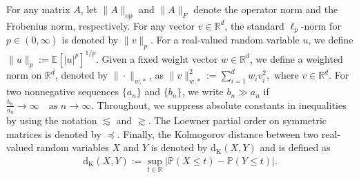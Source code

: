 \documentclass[11pt,letterpaper]{article}
\theoremstyle{plain}
\theoremstyle{definition}  %
\begin{document}
For any matrix $A$, let $\|A\|_{\mathrm{op}}$ and $\|A\|_{F}$ denote the operator norm and the Frobenius norm, respectively. For any vector $v \in \mathbb{R}^d$, the standard $\ell_p$-norm for $p \in (0,\infty)$ is denoted by $\|v\|_p$. For a real-valued random variable $u$, we define $\|u\|_p := \mathbb{E}\!\left[ |u|^p \right]^{1/p}.$ Given a fixed weight vector $w \in \mathbb{R}^d$, we define a weighted norm on $\mathbb{R}^d$, denoted by $\|\cdot\|_{w,\ast}$, as $\|v\|_{w,\ast}^2 := \sum_{i=1}^d w_i v_i^2,$ where $v \in \mathbb{R}^d.$ For two nonnegative sequences $\{a_n\}$ and $\{b_n\}$, we write $b_n \gg a_n$ if $\frac{b_n}{a_n} \to \infty \quad \text{as } n \to \infty .$ Throughout, we suppress absolute constants in inequalities by using the notation $\lesssim$ and $\gtrsim$. The Loewner partial order on symmetric matrices is denoted by $\preceq$. Finally, the Kolmogorov distance between two real-valued random variables $X$ and $Y$ is denoted by $\mathrm{d}_{\mathrm{K}}(X,Y)$ and is defined as
\begin{align*}
\mathrm{d}_{\mathrm{K}}(X,Y)
:= \sup_{t \in \mathbb{R}} \left| \mathbb{P}(X \le t) - \mathbb{P}(Y \le t) \right|.
\end{align*}
\end{document}
